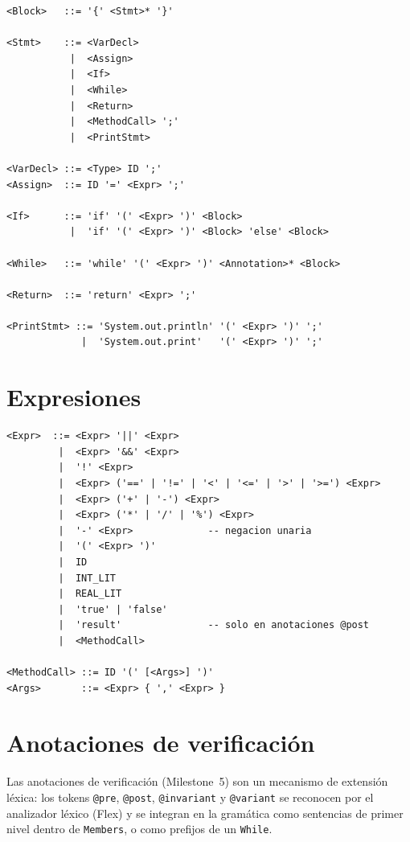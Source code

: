 \begin{lstlisting}[style=pseudo, caption={Sentencias del subconjunto}]
<Block>   ::= '{' <Stmt>* '}'

<Stmt>    ::= <VarDecl>
           |  <Assign>
           |  <If>
           |  <While>
           |  <Return>
           |  <MethodCall> ';'
           |  <PrintStmt>

<VarDecl> ::= <Type> ID ';'
<Assign>  ::= ID '=' <Expr> ';'

<If>      ::= 'if' '(' <Expr> ')' <Block>
           |  'if' '(' <Expr> ')' <Block> 'else' <Block>

<While>   ::= 'while' '(' <Expr> ')' <Annotation>* <Block>

<Return>  ::= 'return' <Expr> ';'

<PrintStmt> ::= 'System.out.println' '(' <Expr> ')' ';'
             |  'System.out.print'   '(' <Expr> ')' ';'
\end{lstlisting}

\section{Expresiones}

\begin{lstlisting}[style=pseudo, caption={Gramática de expresiones (precedencia ascendente)}]
<Expr>  ::= <Expr> '||' <Expr>
         |  <Expr> '&&' <Expr>
         |  '!' <Expr>
         |  <Expr> ('==' | '!=' | '<' | '<=' | '>' | '>=') <Expr>
         |  <Expr> ('+' | '-') <Expr>
         |  <Expr> ('*' | '/' | '%') <Expr>
         |  '-' <Expr>             -- negacion unaria
         |  '(' <Expr> ')'
         |  ID
         |  INT_LIT
         |  REAL_LIT
         |  'true' | 'false'
         |  'result'               -- solo en anotaciones @post
         |  <MethodCall>

<MethodCall> ::= ID '(' [<Args>] ')'
<Args>       ::= <Expr> { ',' <Expr> }
\end{lstlisting}

\section{Anotaciones de verificación}

Las anotaciones de verificación (Milestone~5) son un mecanismo de
extensión léxica: los tokens \texttt{@pre}, \texttt{@post},
\texttt{@invariant} y \texttt{@variant} se reconocen por el analizador
léxico (Flex) y se integran en la gramática como sentencias de primer
nivel dentro de \texttt{Members}, o como prefijos de un \texttt{While}.

